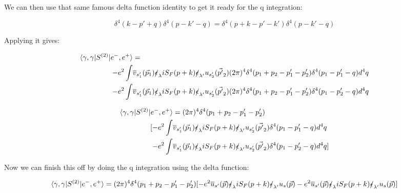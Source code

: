 \documentclass[a4]{article}
\begin{document}
\begin{framed}
            We can then use that same famous delta function identity to get it ready for the q integration:

            \begin{equation}
                \delta^{4} (k - p' + q) \delta^{4} (p - k' - q) = \delta^{4} (p + k - p' - k') \delta^{4} (p - k' - q)
            \end{equation}

            Applying it gives:

            \begin{equation}
                \begin{aligned}
                    \langle \gamma, \gamma | S^{(2)} | e^{-}, e^{+} \rangle & = \\
                    -e^{2} \int & \overline{v}_{s'_1} (\vec{p}_1) \slashed{\epsilon}_{\lambda} i S_{F} (p + k) \slashed{\epsilon}_{\lambda'} u_{s'_2} (\vec{p'}_2) (2 \pi)^4 \delta^{4} (p_1 + p_2 - p'_1 - p'_2) \delta^{4} (p_1 - p'_1 - q) d^{4} q \\
                    -e^{2} \int & \overline{v}_{s'_1} (\vec{p}_1) \slashed{\epsilon}_{\lambda} i S_{F} (p + k) \slashed{\epsilon}_{\lambda'} u_{s'_2} (\vec{p'}_2) (2 \pi)^4 \delta^{4} (p_1 + p_2 - p'_1 - p'_2) \delta^{4} (p_1 - p'_2 - q) d^{4} q
                \end{aligned}
            \end{equation}

            \begin{equation}
                \begin{aligned}
                    \langle \gamma, \gamma | S^{(2)} | e^{-}, e^{+} \rangle & = (2 \pi)^{4} \delta^{4} (p_1 + p_2 - p'_1 - p'_2) \\
                    [ -e^{2} \int & \overline{v}_{s'_1} (\vec{p}_1) \slashed{\epsilon}_{\lambda} i S_{F} (p + k) \slashed{\epsilon}_{\lambda'} u_{s'_2} (\vec{p'}_2) \delta^{4} (p_1 - p'_1 - q) d^{4} q \\
                    -e^{2} \int & \overline{v}_{s'_1} (\vec{p}_1) \slashed{\epsilon}_{\lambda} i S_{F} (p + k) \slashed{\epsilon}_{\lambda'} u_{s'_2} (\vec{p'}_2) \delta^{4} (p_1 - p'_2 - q) d^{4} q]
                \end{aligned}
            \end{equation}

            Now we can finish this off by doing the q integration using the delta function:

            \begin{equation}
                \langle \gamma, \gamma | S^{(2)} | e^{-}, e^{+} \rangle = (2 \pi)^{4} \delta^{4} (p_1 + p_2 - p'_1 - p'_2) [-e^{2} \overline{u}_{s'} (\vec{p}) \slashed{\epsilon}_{\lambda} i S_{F} (p + k) \slashed{\epsilon}_{\lambda'} u_{s} (\vec{p}) - e^{2} \overline{u}_{s'} (\vec{p}) \slashed{\epsilon}_{\lambda} i S_{F} (p + k) \slashed{\epsilon}_{\lambda'} u_{s} (\vec{p})]
            \end{equation}

        \end{framed}
\end{document}
